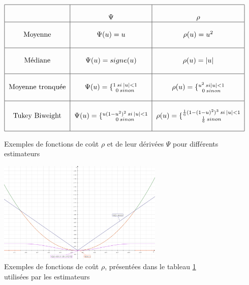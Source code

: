 \label{tab:ch4_cost_functions}
\begin{figure}
	\begin{equation*}
		\begin{tabular}{| c | c | c |}
			\hline
			& & \\
			{}	& $\boldmath{\Psi}$ &	$\boldmath{\rho}$	\\
			\hline
			& & \\
			Moyenne	& $\Psi(u) = u$	&	$\rho(u) = u^2$		\\
			& & \\
			\hline
			& & \\
			Médiane	& $\Psi(u) = signe(u)$	& $\rho(u) = \lvert u \rvert$ \\
			& & \\
			\hline
			& & \\
			Moyenne tronquée & $\Psi(u) = \lbrace \substack{ 1 \: si \: \lvert u \rvert<1 \\ 0 \: sinon}$ & $\rho(u) = \lbrace \substack{ u^2 \: si \lvert u \rvert<1 \\ 0 \: sinon}$ \\
			& & \\
			\hline
			& & \\
			Tukey Biweight & $\Psi(u) = \lbrace \substack { u(1-u^2)^2 \: si \: \lvert u \rvert<1 \\ 0 \: sinon }$ & $\rho(u) = \lbrace \substack { \frac{1}{6} (1 - (1-u)^2)^3 \: si \: \lvert u \rvert<1 \\ \frac{1}{6} \: sinon}$ \\
			& & \\
			\hline
		\end{tabular}
	\end{equation*}
	\caption{Exemples de fonctions de coût $\rho$ et de leur dérivées $\Psi$ pour différents estimateurs}
	\label{tab:ch4_exemple_estimateurs}
\end{figure}

\begin{figure} 
	\centering
	\includegraphics[width=0.7\textwidth]{Chapter4/graphics/objective_functions.png}
	\caption{Exemples de fonctions de coût $\rho$, présentées dans le tableau \ref{tab:ch4_exemple_estimateurs} utilisées par les estimateurs}
	\label{fig:ch4_ml_metrics}
\end{figure}

